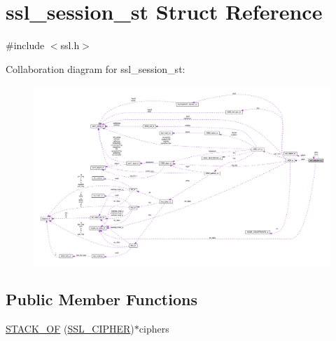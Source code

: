 \hypertarget{structssl__session__st}{}\section{ssl\+\_\+session\+\_\+st Struct Reference}
\label{structssl__session__st}


{\ttfamily \#include $<$ssl.\+h$>$}



Collaboration diagram for ssl\+\_\+session\+\_\+st\+:
\nopagebreak
\begin{figure}[H]
\begin{center}
\leavevmode
\includegraphics[width=350pt]{structssl__session__st__coll__graph}
\end{center}
\end{figure}
\subsection*{Public Member Functions}
\begin{DoxyCompactItemize}
\item 
\hyperlink{structssl__session__st_a2f3bc734f54c269abc797fa55b4085a2}{S\+T\+A\+C\+K\+\_\+\+OF} (\hyperlink{ssl_8h_a548d7a5d565a9e0e9bd45c49f8c95701}{S\+S\+L\+\_\+\+C\+I\+P\+H\+ER})$\ast$ciphers
\end{DoxyCompactItemize}

